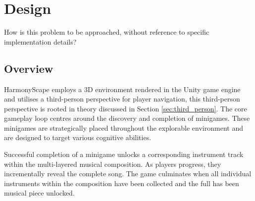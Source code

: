 \documentclass{l4proj}
\begin{document}



\chapter{Design}
How is this problem to be approached, without reference to specific implementation details? 




\section{Overview}
HarmonyScape employs a 3D environment rendered in the Unity game engine and utilises a third-person perspective for player navigation, this third-person perspective is rooted in theory discussed in Section \ref{sec:third_person}.  The core gameplay loop centres around the discovery and completion of minigames. These minigames are strategically placed throughout the explorable environment and are designed to target various cognitive abilities.

Successful completion of a minigame unlocks a corresponding instrument track within the multi-layered musical composition. As players progress, they incrementally reveal the complete song. The game culminates when all individual instruments within the composition have been collected and the full has been musical piece unlocked.
\end{document}
